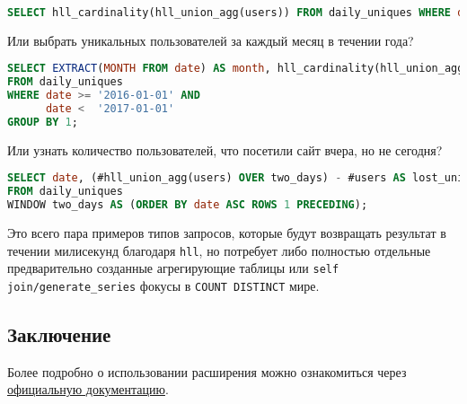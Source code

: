 \begin{lstlisting}[language=SQL,label=lst:pghll5,caption=daily\_uniques за неделю]
SELECT hll_cardinality(hll_union_agg(users)) FROM daily_uniques WHERE date >= '2017-02-20'::date AND date <= '2017-02-26'::date;
\end{lstlisting}

Или выбрать уникальных пользователей за каждый месяц в течении года?

\begin{lstlisting}[language=SQL,label=lst:pghll6,caption=daily\_uniques за каждый месяц]
SELECT EXTRACT(MONTH FROM date) AS month, hll_cardinality(hll_union_agg(users))
FROM daily_uniques
WHERE date >= '2016-01-01' AND
      date <  '2017-01-01'
GROUP BY 1;
\end{lstlisting}

Или узнать количество пользователей, что посетили сайт вчера, но не сегодня?

\begin{lstlisting}[language=SQL,label=lst:pghll7,caption=daily\_uniques за вчера но не сегодня]
SELECT date, (#hll_union_agg(users) OVER two_days) - #users AS lost_uniques
FROM daily_uniques
WINDOW two_days AS (ORDER BY date ASC ROWS 1 PRECEDING);
\end{lstlisting}

Это всего пара примеров типов запросов, которые будут возвращать результат в течении милисекунд благодаря \lstinline!hll!, но потребует либо полностью отдельные предварительно созданные агрегирующие таблицы или \lstinline!self join/generate_series! фокусы в \lstinline!COUNT DISTINCT! мире.

\subsection{Заключение}

Более подробно о использовании расширения можно ознакомиться через \href{https://github.com/aggregateknowledge/postgresql-hll/blob/master/README.markdown}{официальную документацию}.
